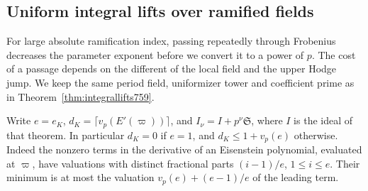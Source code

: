 \documentclass[a4paper,11pt]{article}
\theoremstyle{definition}
\theoremstyle{remark}
\numberwithin{equation}{section}
\begin{document}
\subsection{Uniform integral lifts over ramified fields}
\label{sec:ramifiedlifts761}
For large absolute ramification index, passing repeatedly through
Frobenius decreases the parameter exponent before we convert
it to a power of \(p\). The cost of a passage depends on the
different of the local field and the upper Hodge jump. We keep
the same period field, uniformizer tower and coefficient prime
as in Theorem~\ref{thm:integrallifts759}.

Write \(e=e_K\), \(d_K=\lceil v_p(E'(\varpi))\rceil\), and
\(I_\nu=I+p^\nu\mathfrak S\), where \(I\) is the ideal of
that theorem. In particular \(d_K=0\) if \(e=1\), and
\(d_K\le1+v_p(e)\) otherwise. Indeed the nonzero terms in
the derivative of an Eisenstein polynomial, evaluated at
\(\varpi\), have valuations with distinct fractional parts
\((i-1)/e\), \(1\le i\le e\). Their minimum is at most the
valuation \(v_p(e)+(e-1)/e\) of the leading term.
\end{document}

